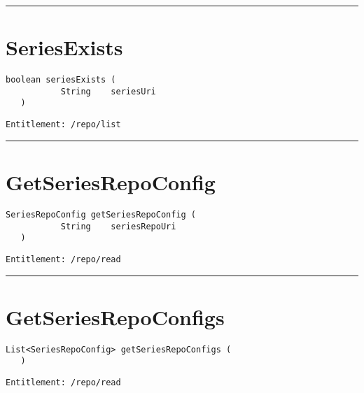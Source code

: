 \rule{12cm}{2pt}
\section{SeriesExists}
\label{Api:SeriesExists}
\begin{lstlisting}[style=nonumbers]
   boolean seriesExists (
           String    seriesUri
   )
\end{lstlisting}
\begin{Verbatim}[formatcom=\color{Maroon}]
  Entitlement: /repo/list
\end{Verbatim}



\rule{12cm}{2pt}
\section{GetSeriesRepoConfig}
\label{Api:GetSeriesRepoConfig}
\begin{lstlisting}[style=nonumbers]
   SeriesRepoConfig getSeriesRepoConfig (
           String    seriesRepoUri
   )
\end{lstlisting}
\begin{Verbatim}[formatcom=\color{Maroon}]
  Entitlement: /repo/read
\end{Verbatim}



\rule{12cm}{2pt}
\section{GetSeriesRepoConfigs}
\label{Api:GetSeriesRepoConfigs}
\begin{lstlisting}[style=nonumbers]
   List<SeriesRepoConfig> getSeriesRepoConfigs (
   )
\end{lstlisting}
\begin{Verbatim}[formatcom=\color{Maroon}]
  Entitlement: /repo/read
\end{Verbatim}




